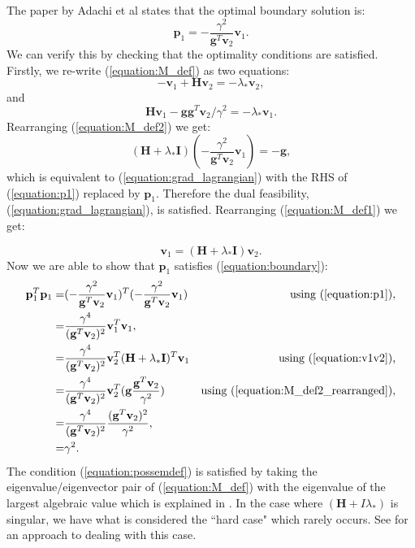 \documentclass[letterpaper,12pt,titlepage,oneside,final]{book}
\begin{document}
	The paper by Adachi et al \cite{adachi.paper} states that the optimal boundary solution is:
	\begin{equation}
	\mathbf{p}_{1} = - \frac{\gamma^{2}}{\mathbf{g}^{T}\mathbf{v}_{2}}\mathbf{v}_{1}.
	\label{equation:p1}
	\end{equation}
	We can verify this by checking that the optimality conditions are satisfied. Firstly, we re-write (\ref{equation:M_def}) as two equations:
	\begin{equation}
	-\mathbf{v}_{1} + \mathbf{H}\mathbf{v}_{2} = -\lambda_{*}\mathbf{v}_{2},
	\label{equation:M_def1}
	\end{equation}
	and
	\begin{equation}
	\mathbf{H}\mathbf{v}_{1}-\mathbf{gg}^{T}\mathbf{v}_{2}/\gamma^{2} = -\lambda_{*}\mathbf{v}_{1}.
	\label{equation:M_def2}
	\end{equation}
	Rearranging (\ref{equation:M_def2}) we get:
	\begin{equation}
	(\mathbf{H} + \lambda_{*}\mathbf{I})(- \frac{\gamma^{2}}{\mathbf{g}^{T}\mathbf{v}_{2}}\mathbf{v}_{1}) = -\mathbf{g},
	\label{equation:M_def2_rearranged}
	\end{equation}
	which is equivalent to (\ref{equation:grad_lagrangian}) with the RHS of (\ref{equation:p1}) replaced by $\mathbf{p}_{1}$. Therefore the dual feasibility, (\ref{equation:grad_lagrangian}), is satisfied. Rearranging (\ref{equation:M_def1}) we get:
	
	\begin{equation}
	\mathbf{v}_{1} = (\mathbf{H} + \lambda_{*}\mathbf{I})\mathbf{v}_{2}.
	\label{equation:v1v2}
	\end{equation}
	Now we are able to show that $\mathbf{p}_{1}$ satisfies (\ref{equation:boundary}):
	\begin{align*}
	\mathbf{p}_{1}^{T}\mathbf{p}_{1} =  & (- \frac{\gamma^{2}}{\mathbf{g}^{T}\mathbf{v}_{2}}\mathbf{v}_{1})^{T}(- \frac{\gamma^{2}}{\mathbf{g}^{T}\mathbf{v}_{2}}\mathbf{v}_{1}) & \text{using (\ref{equation:p1})},\\
	= & \frac{\gamma^{4}}{(\mathbf{g}^{T}\mathbf{v}_{2})^{2}}\mathbf{v}_{1}^{T}\mathbf{v}_{1}, \\
	= & \frac{\gamma^{4}}{(\mathbf{g}^{T}\mathbf{v}_{2})^{2}}\mathbf{v}_{2}^{T}(\mathbf{H} + \lambda_{*}\mathbf{I})^{T}\mathbf{v}_{1} & \text{using (\ref{equation:v1v2}),} \\ 
	= & \frac{\gamma^{4}}{(\mathbf{g}^{T}\mathbf{v}_{2})^{2}}\mathbf{v}_{2}^{T}(\mathbf{g}\frac{\mathbf{g}^{T}\mathbf{v}_{2}}{\gamma^{2}}) & \text{using (\ref{equation:M_def2_rearranged})},\\
	= & \frac{\gamma^{4}}{(\mathbf{g}^{T}\mathbf{v}_{2})^{2}}\frac{(\mathbf{g}^{T}\mathbf{v}_{2})^{2}}{\gamma^{2}}, \\
	= &\gamma^{2}.
	\end{align*}
	The condition (\ref{equation:possemdef}) is satisfied by taking the eigenvalue/eigenvector pair of (\ref{equation:M_def}) with the eigenvalue of the largest algebraic value which is explained in \cite{adachi.paper}. In the case where $(\mathbf{H} + I\lambda_{*})$ is singular, we have what is considered the ``hard case" which rarely occurs. See \cite{adachi.paper} for an approach to dealing with this case.  
	
\end{document}
